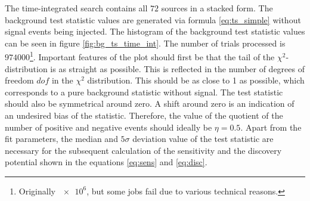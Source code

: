 The time-integrated search contains all $\num{72}$ sources in a stacked form.
The background test statistic values are generated via formula \eqref{eq:ts_simple} without signal events being injected.
The histogram of the background test statistic values can be seen in figure \ref{fig:bg_ts_time_int}.
The number of trials processed is $\num{974000}$\footnote{Originally $\num{e6}$, but some jobs fail due to various technical reasons.}.
Important features of the plot should first be that the tail of the $\chi^2$-distribution is as straight as possible.
This is reflected in the number of degrees of freedom $dof$ in the $\chi^2$ distribution.
This should be as close to 1 as possible, which corresponds to a pure background statistic without signal.
The test statistic should also be symmetrical around zero.
A shift around zero is an indication of an undesired bias of the statistic.
Therefore, the value of the quotient of the number of positive and negative events should ideally be $\eta = \num{0.5}$.
Apart from the fit parameters, the median and $5\sigma$ deviation value of the test statistic are necessary for the subsequent calculation of the sensitivity and the discovery potential shown in the equations \eqref{eq:sens} and \eqref{eq:disc}.

